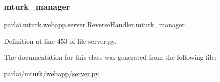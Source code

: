 \subsubsection{\texorpdfstring{mturk\+\_\+manager}{mturk\_manager}}
{\footnotesize\ttfamily parlai.\+mturk.\+webapp.\+server.\+Reverse\+Handler.\+mturk\+\_\+manager}



Definition at line 453 of file server.\+py.



The documentation for this class was generated from the following file\+:\begin{DoxyCompactItemize}
\item 
parlai/mturk/webapp/\hyperlink{server_8py}{server.\+py}\end{DoxyCompactItemize}
